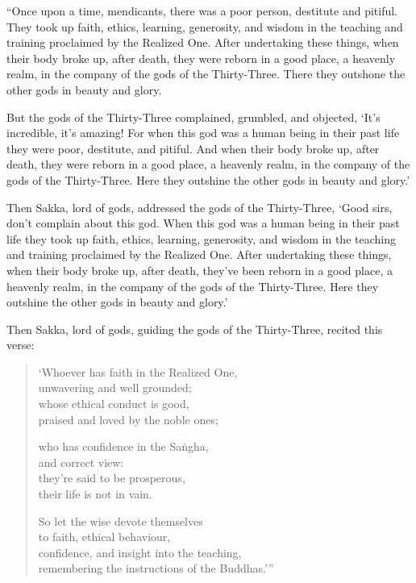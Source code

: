 \documentclass[12pt,openany]{book}%
\begin{document}
“Once upon a time, mendicants, there was a poor person, destitute and pitiful. They took up faith, ethics, learning, generosity, and wisdom in the teaching and training proclaimed by the Realized One. After undertaking these things, when their body broke up, after death, they were reborn in a good place, a heavenly realm, in the company of the gods of the Thirty-Three. There they outshone the other gods in beauty and glory. 

But the gods of the Thirty-Three complained, grumbled, and objected, ‘It’s incredible, it’s amazing! For when this god was a human being in their past life they were poor, destitute, and pitiful. And when their body broke up, after death, they were reborn in a good place, a heavenly realm, in the company of the gods of the Thirty-Three. Here they outshine the other gods in beauty and glory.’ 

Then Sakka, lord of gods, addressed the gods of the Thirty-Three, ‘Good sirs, don’t complain about this god. When this god was a human being in their past life they took up faith, ethics, learning, generosity, and wisdom in the teaching and training proclaimed by the Realized One. After undertaking these things, when their body broke up, after death, they’ve been reborn in a good place, a heavenly realm, in the company of the gods of the Thirty-Three. Here they outshine the other gods in beauty and glory.’ 

Then Sakka, lord of gods, guiding the gods of the Thirty-Three, recited this verse: 

\begin{verse}%
‘Whoever has faith in the Realized One, \\
unwavering and well grounded; \\
whose ethical conduct is good, \\
praised and loved by the noble ones; 

who has confidence in the \textsanskrit{Saṅgha}, \\
and correct view: \\
they’re said to be prosperous, \\
their life is not in vain. 

So let the wise devote themselves \\
to faith, ethical behaviour, \\
confidence, and insight into the teaching, \\
remembering the instructions of the Buddhas.’” 

%
\end{verse}
\end{document}
